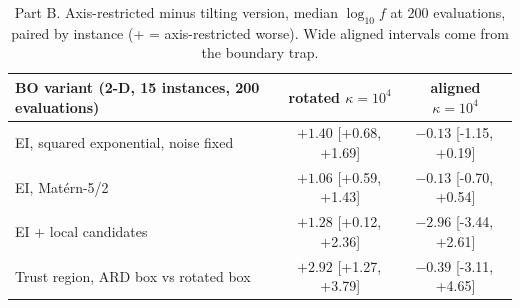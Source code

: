 \documentclass[10pt,a4paper]{article}
\newcommand{\ci}[2]{[#1,\,#2]}
\begin{document}
\begin{table}[t]
\centering\small
\begin{tabular}{lcc}
\toprule
BO variant (2-D, 15 instances, 200 evaluations) & rotated $\kappa=10^4$ & aligned $\kappa=10^4$ \\
\midrule
EI, squared exponential, noise fixed & $+1.40$ \ci{+0.68}{+1.69} & $-0.13$ \ci{-1.15}{+0.19} \\
EI, Mat\'ern-5/2 & $+1.06$ \ci{+0.59}{+1.43} & $-0.13$ \ci{-0.70}{+0.54} \\
EI + local candidates & $+1.28$ \ci{+0.12}{+2.36} & $-2.96$ \ci{-3.44}{+2.61} \\
Trust region, ARD box vs rotated box & $+2.92$ \ci{+1.27}{+3.79} & $-0.39$ \ci{-3.11}{+4.65} \\
\bottomrule
\end{tabular}
\caption{Part B. Axis-restricted minus tilting version, median $\log_{10}f$ at 200 evaluations, paired by instance
(+ = axis-restricted worse). Wide aligned intervals come from the boundary trap.}
\label{tab:robust}
\end{table}
\end{document}
